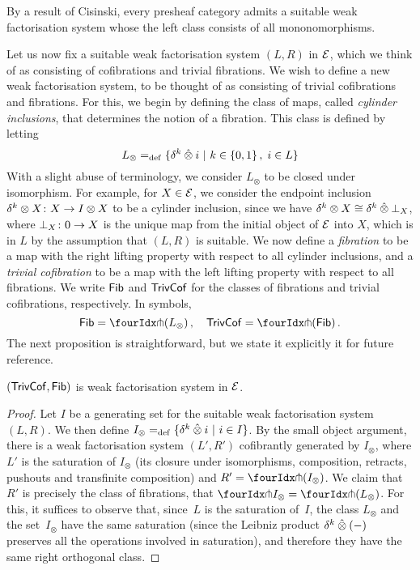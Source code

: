 \documentclass[reqno,10pt,a4paper,oneside,draft]{amsart}
\begin{document}
\begin{example} \label{thm:generation-presheaf-cisinski} By a result of Cisinski, every presheaf category admits a suitable weak factorisation
system whose the left class consists of all mononomorphisms. 
\end{example} 


Let us now fix a suitable weak factorisation system $(L,R)$ in $\catE$, which we think of as consisting of cofibrations and trivial fibrations. 
We wish to define a new weak factorisation system, to be thought of as consisting of trivial cofibrations and fibrations. For this, we begin by defining the class of maps, called \emph{cylinder inclusions}, that determines the notion of a fibration. This class is defined by letting
\begin{equation}
\label{equ:cylinc}
L_\otimes \defeq \{ \kcyl \hatotimes i \ | \ k \in \{ 0, 1 \} \, , \; i \in L \}
\end{equation}
With a slight abuse of terminology, we consider $L_\otimes$ to be closed under isomorphism. For example, for $X \in \catE$, we consider
the endpoint inclusion $\kcyl \otimes X \co X \to \interval \otimes X$ to be a cylinder inclusion, since we have $\kcyl \otimes X \iso 
\kcyl \hatotimes \bot_X$, where $\bot_X \co 0 \to X$ is the unique map from the initial object of $\catE$ into $X$, which is in $L$
by the assumption that $(L, R)$ is suitable. We now define a \emph{fibration} to be a map with the right lifting property with respect to all cylinder inclusions, and a \emph{trivial cofibration} to be a map with the left lifting property with respect to all fibrations. We write $\Fib$ and $\TrivCof$ for the classes of fibrations and trivial cofibrations, respectively. In symbols,
\[
 \Fib = \liftr{(L_\otimes)} \, , \quad \TrivCof = \liftl{(\Fib)} \, .
 \]
The next proposition is straightforward, but we state it explicitly it for future reference. 

\begin{proposition} \label{thm:wfstimes} $(\TrivCof, \Fib)$ is weak factorisation system in $\cal{E}$.
\end{proposition}

\begin{proof} Let $I$ be a generating set for the suitable weak factorisation system $(L, R)$.
We then define $I_\otimes \defeq \{ \delta^k \hatotimes i \ | \ i \in I \}$. By the small object argument, 
there is a weak factorisation system $(L', R')$ cofibrantly generated by $I_\otimes$, where
$L'$ is the saturation of $I_\otimes$ (\ie its closure under isomorphisms, composition, retracts, pushouts and transfinite composition) 
and $R' = \liftr{(I_\otimes)}$. 
We claim that $R'$ is precisely the class of
fibrations, \ie that $\liftr{I_\otimes} = \liftr{(L_\otimes)}$. For this, it suffices to observe that, since~$L$ is the saturation of~$I$, the class
$L_\otimes$ and the set~$I_\otimes$ have the same saturation (since the Leibniz product $\kcyl \hatotimes (-)$ preserves all the operations involved in saturation), and therefore they have the same right orthogonal class.
\end{proof}
\end{document}
